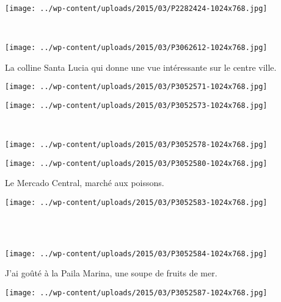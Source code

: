 \pagebreak
~
\begin{center} \texttt{[image: ../wp-content/uploads/2015/03/P2282424-1024x768.jpg]} \end{center}
~
\begin{center} \texttt{[image: ../wp-content/uploads/2015/03/P3062612-1024x768.jpg]} \end{center}
\vspace{-\topsep}

\pagebreak
La colline Santa Lucia qui donne une vue intéressante sur le centre ville. 
\begin{center} \texttt{[image: ../wp-content/uploads/2015/03/P3052571-1024x768.jpg]} \end{center}
\begin{center} \texttt{[image: ../wp-content/uploads/2015/03/P3052573-1024x768.jpg]} \end{center}
\vspace{-\topsep}
\vspace{-3mm}

\pagebreak
~\\
\begin{center} \texttt{[image: ../wp-content/uploads/2015/03/P3052578-1024x768.jpg]} \end{center}
\begin{center} \texttt{[image: ../wp-content/uploads/2015/03/P3052580-1024x768.jpg]} \end{center}
\vspace{-\topsep}
\vspace{-3mm}

\pagebreak
Le Mercado Central, marché aux poissons. 
\begin{center} \texttt{[image: ../wp-content/uploads/2015/03/P3052583-1024x768.jpg]} \end{center}
~\\~\\
\begin{center} \texttt{[image: ../wp-content/uploads/2015/03/P3052584-1024x768.jpg]} \end{center}
\vspace{-\topsep}

\pagebreak
J'ai goûté à la Paila Marina, une soupe de fruits de mer. 
\begin{center} \texttt{[image: ../wp-content/uploads/2015/03/P3052587-1024x768.jpg]} \end{center}

